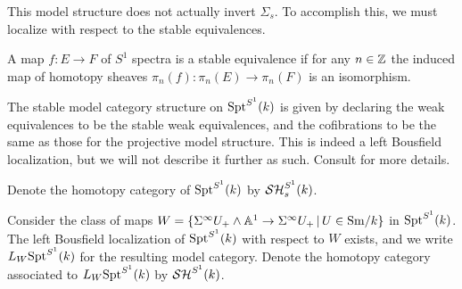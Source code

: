 \documentclass{amsart}%
\begin{document}
This model structure does not actually invert $\Sigma_s$. To
accomplish this, we must localize with respect to the stable
equivalences.

\begin{definition}
  A map $f : E \to F$ of $S^1$ spectra is a stable equivalence if for
  any $n\in \mathbb{Z}$ the induced map of homotopy sheaves
  $\pi_n(f) : \pi_n(E) \to \pi_n(F)$ is an isomorphism.

  The stable model category structure on $\mathrm{Spt}^{S^1}(k)$ is given by
  declaring the weak equivalences to be the stable weak equivalences,
  and the cofibrations to be the same as those for the projective
  model structure. This is indeed a left Bousfield localization, but
  we will not describe it further as such. Consult \cite{H-Spt} for
  more details. 

  Denote the homotopy category of $\mathrm{Spt}^{S^1}(k)$ by $\mathcal{SH}^{S^1}_s(k)$.
\end{definition}

\begin{definition}
  Consider the class of maps
  $ W = \{\Sigma^{\infty} U_+ \wedge \mathbb{A}^1 \to \Sigma^{\infty}U_+ \, \vert \,
  U \in \mathrm{Sm}/k\}$
  in $\mathrm{Spt}^{S^1}(k)$. The left Bousfield localization of
  $\mathrm{Spt}^{S^1}(k)$ with respect to $W$ exists, and we write
  $L_W\mathrm{Spt}^{S^1}(k)$ for the resulting model category. Denote the
  homotopy category associated to $L_W\mathrm{Spt}^{S^1}(k)$ by
  $\mathcal{SH}^{S^1}(k)$.
\end{definition}
\end{document}
